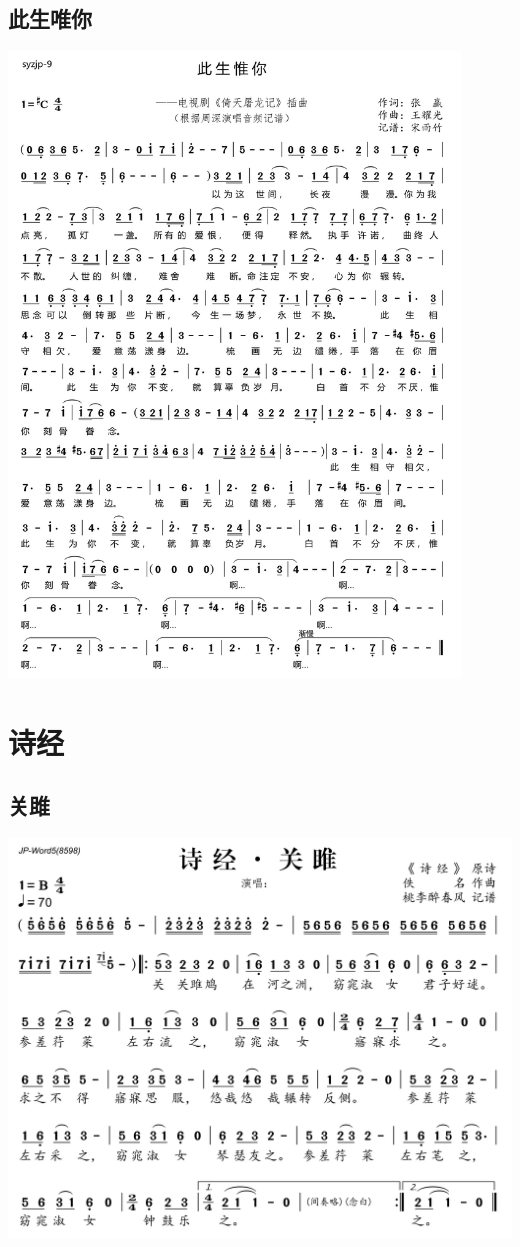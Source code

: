 \documentclass[cn,pad,twocol]{elegantbook}
\begin{document}
\section{此生唯你}  \includegraphics[width=0.9\textwidth]{rpi400/20210130此生惟你.jpg}

\chapter{诗经}
\section{关雎}      \includegraphics[width=\textwidth]{rpi400/20210124关雎.png}
\end{document}
